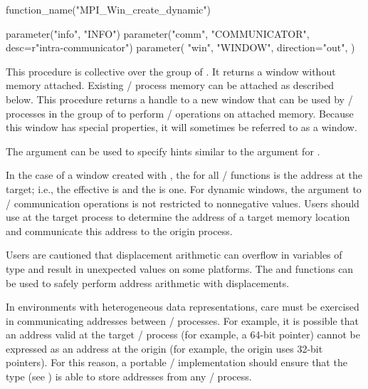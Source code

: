 %
%
\begin{mpi-binding}
    function_name("MPI_Win_create_dynamic")
    
    parameter("info", "INFO")
    parameter("comm", "COMMUNICATOR", desc=r"intra-communicator")
    parameter(
        "win",
        "WINDOW",
        direction="out",
    )
\end{mpi-binding}

This procedure is collective over the group of
. It returns a window  without memory attached.
Existing \mpi/ process memory can be attached as described below.
This procedure returns a handle to a new window that can be used by \mpi/ processes in the group of 
to perform \RMA/ operations on attached memory.
Because this window has special properties, it will sometimes be
referred to as a 
window.

The  argument can be used to specify hints
similar to the  argument for .  

In the case of a window created with
, the  for all
\RMA/ functions is the address at the target; i.e., the effective
 is  and the  is one.
For dynamic windows, the 
  argument to \RMA/ communication operations is not restricted to
  nonnegative values.
Users
should use  at the target process to
determine the address of a target memory location and communicate this
address to the origin process.  

\begin{users}
Users are cautioned that displacement arithmetic can overflow in
variables of type  and result in unexpected values on some
platforms.
The  and 
functions can be used to safely perform address arithmetic with 
displacements.
\end{users}

\begin{implementors}
In environments with heterogeneous data representations, care must be
exercised in communicating addresses between \mpi/ processes.  For example, it
is possible that an address valid at the target \mpi/ process (for example, a
64-bit pointer) cannot be expressed as an address at the origin (for
example, the origin uses 32-bit pointers).  For this reason, a portable
\MPI/ implementation should ensure that the type 
(see ) is able to store addresses
from any \mpi/ process.
\end{implementors}

